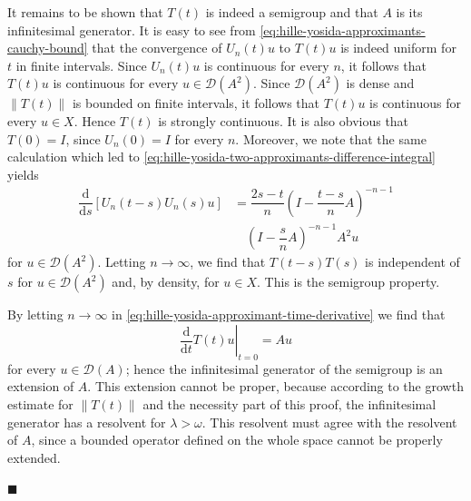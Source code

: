 It remains to be shown that $T(t)$ is indeed a semigroup and that $A$ is its infinitesimal generator. It is easy to see from \eqref{eq:hille-yosida-approximants-cauchy-bound} that the convergence of $U_n(t)u$ to $T(t)u$ is indeed uniform for $t$ in finite intervals. Since $U_n(t)u$ is continuous for every $n$, it follows that $T(t)u$ is continuous for every $u\in\mathcal{D}(A^2)$. Since $\mathcal{D}(A^2)$ is dense and $\|T(t)\|$ is bounded on finite intervals, it follows that $T(t)u$ is continuous for every $u\in X$. Hence $T(t)$ is strongly continuous. It is also obvious that $T(0)=I$, since $U_n(0)=I$ for every $n$. Moreover, we note that the same calculation which led to \eqref{eq:hille-yosida-two-approximants-difference-integral} yields
\begin{equation}\label{eq:hille-yosida-semigroup-composition-derivative-bound}
\begin{aligned}\dfrac{\mathrm{d}}{\mathrm{d}s}[U_n(t-s)U_n(s)u]&=\dfrac{2s-t}{n}\left(I-\dfrac{t-s}{n}A\right)^{-n-1}\\&\quad\left(I-\dfrac{s}{n}A\right)^{-n-1}A^2u\end{aligned}
\end{equation}
for $u\in\mathcal{D}(A^2)$. Letting $n\to\infty$, we find that $T(t-s)T(s)$ is independent of $s$ for $u\in\mathcal{D}(A^2)$ and, by density, for $u\in X$. This is the semigroup property.

\begingroup
\renewenvironment{Proof}{\par}{\par\nobreak\hfill$\blacksquare$\par\vspace{0.1cm}}
\begin{Proof}
By letting $n\to\infty$ in \eqref{eq:hille-yosida-approximant-time-derivative} we find that
\begin{equation}\label{eq:hille-yosida-limit-generator-initial-derivative}
\left.\dfrac{\mathrm{d}}{\mathrm{d}t}T(t)u\right|_{t=0}=Au
\end{equation}
for every $u\in\mathcal{D}(A)$; hence the infinitesimal generator of the semigroup is an extension of $A$. This extension cannot be proper, because according to the growth estimate for $\|T(t)\|$ and the necessity part of this proof, the infinitesimal generator has a resolvent for $\lambda>\omega$. This resolvent must agree with the resolvent of $A$, since a bounded operator defined on the whole space cannot be properly extended.
\end{Proof}
\endgroup

